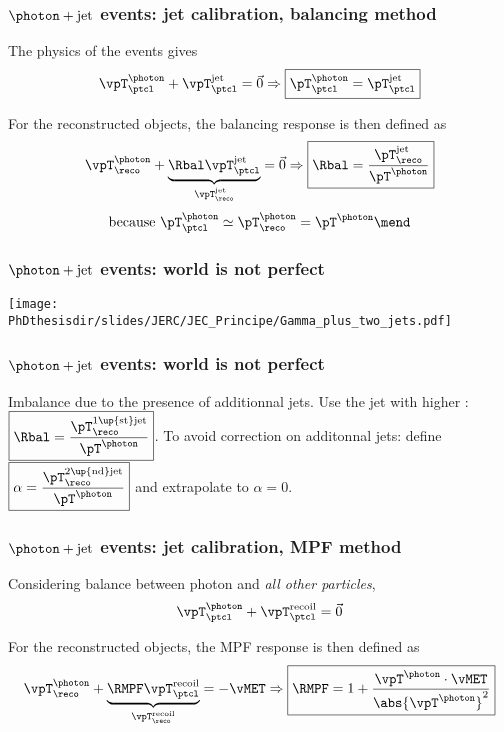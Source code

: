 \begin{frame}
\frametitle{$\photon+\text{jet}$ events: jet calibration, balancing method}
\manip The physics of the events gives
\begin{equation*}
\vpT^\photon_\ptcl + \vpT^\text{jet}_\ptcl = \vec{0} \Rightarrow \boxed{{\pT}^\photon_\ptcl = {\pT}^\text{jet}_\ptcl}
\end{equation*}

\pause
\vfill

\manip For the reconstructed objects, the balancing response is then defined as
\begin{equation*}
\vpT^\photon_\reco + \underbrace{\Rbal \vpT^\text{jet}_\ptcl}_{\vpT^\text{jet}_\reco} = \vec{0}
\Rightarrow
\boxed{\Rbal = \frac{{\pT}^\text{jet}_\reco}{\pT^\photon}}
\end{equation*}
\begin{equation*}
\text{because }
\pT^\photon_\ptcl\simeq\pT^\photon_\reco
=\pT^\photon
\mend
\end{equation*}
\end{frame}

\begin{frame}
\frametitle{$\photon+\text{jet}$ events: world is not perfect}
\begin{center}
\texttt{[image: \\PhDthesisdir/slides/JERC/JEC\_Principe/Gamma\_plus\_two\_jets.pdf]}
\end{center}
\end{frame}

\begin{frame}
\frametitle{$\photon+\text{jet}$ events: world is not perfect}
\manip Imbalance due to the presence of additionnal jets.
\pause
\manip Use the jet with higher \pT: $\displaystyle \boxed{\Rbal = \frac{{\pT}^\text{1\up{st}jet}_\reco}{\pT^\photon}}$.
\pause
\manip To avoid correction on additonnal jets: define $\displaystyle \boxed{\alpha = \frac{{\pT}^\text{2\up{nd}jet}_\reco}{\pT^\photon}}$ and extrapolate to $\alpha=0$.
\end{frame}

\begin{frame}
\frametitle{$\photon+\text{jet}$ events: jet calibration, MPF method}
\manip Considering balance between photon and \emph{all other particles},
\begin{equation*}
\vpT^\photon_\ptcl + \vpT^\text{recoil}_\ptcl = \vec{0}
\end{equation*}

\pause
\vfill

\manip For the reconstructed objects, the MPF response is then defined as
\begin{equation*}
\vpT^\photon_\reco + \underbrace{\RMPF \vpT^\text{recoil}_\ptcl}_{\vpT^\text{recoil}_\reco} = -\vMET
\Rightarrow
\boxed{\RMPF = 1 + \frac{\vpT^\photon\cdot\vMET}{\abs{\vpT^\photon}^2}}
\end{equation*}
\end{frame}